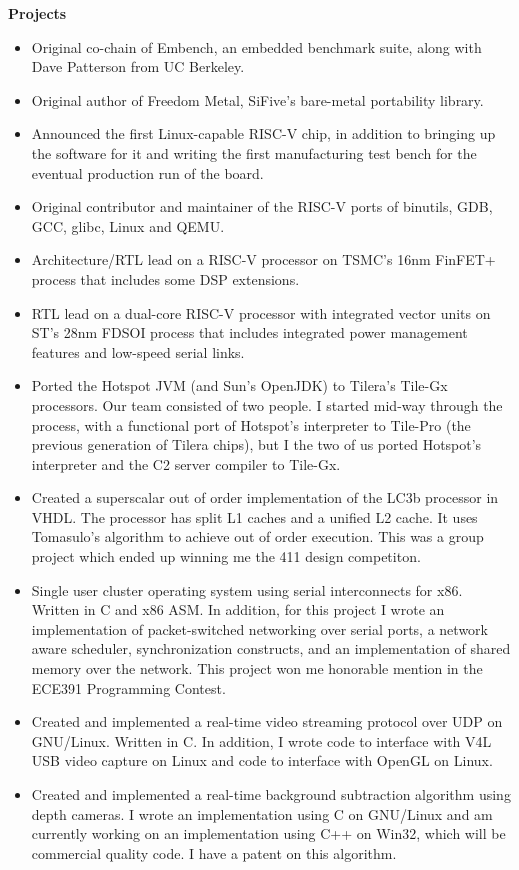\documentclass{letter}
\begin{document}
\textbf{Projects}
\begin{itemize}
\item Original co-chain of Embench, an embedded benchmark suite, along with
  Dave Patterson from UC Berkeley.
\item Original author of Freedom Metal, SiFive's bare-metal portability library.
\item Announced the first Linux-capable RISC-V chip, in addition to bringing up
  the software for it and writing the first manufacturing test bench for the
  eventual production run of the board.
\item Original contributor and maintainer of the RISC-V ports of binutils, GDB,
  GCC, glibc, Linux and QEMU. 
\item Architecture/RTL lead on a RISC-V processor on TSMC's 16nm FinFET+
  process that includes some DSP extensions.
\item RTL lead on a dual-core RISC-V processor with integrated vector units on
  ST's 28nm FDSOI process that includes integrated power management features
  and low-speed serial links.
\item Ported the Hotspot JVM (and Sun's OpenJDK) to Tilera's Tile-Gx
  processors.  Our team consisted of two people.  I started mid-way
  through the process, with a functional port of Hotspot's interpreter
  to Tile-Pro (the previous generation of Tilera chips), but I the two
  of us ported Hotspot's interpreter and the C2 server compiler to
  Tile-Gx.
\item Created a superscalar out of order implementation of the LC3b
  processor in VHDL.  The processor has split L1 caches and a unified
  L2 cache.  It uses Tomasulo's algorithm to achieve out of order
  execution.  This was a group project which ended up winning me the
  411 design competiton.
\item Single user cluster operating system using serial interconnects
  for x86.  Written in C and x86 ASM.  In addition, for this project I
  wrote an implementation of packet-switched networking over serial
  ports, a network aware scheduler, synchronization constructs, and an
  implementation of shared memory over the network.  This project won
  me honorable mention in the ECE391 Programming Contest.
\item Created and implemented a real-time video streaming protocol
  over UDP on GNU/Linux.  Written in C.  In addition, I wrote code to
  interface with V4L USB video capture on Linux and code to interface
  with OpenGL on Linux.
\item Created and implemented a real-time background subtraction
  algorithm using depth cameras.  I wrote an implementation using C on
  GNU/Linux and am currently working on an implementation using C++ on
  Win32, which will be commercial quality code.  I have a patent on
  this algorithm.
\end{itemize}
\end{document}
